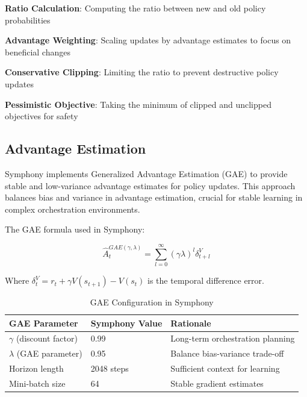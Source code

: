 \begin{expandedlist}
    \item \textbf{Ratio Calculation}: Computing the ratio between new and old policy probabilities
    \item \textbf{Advantage Weighting}: Scaling updates by advantage estimates to focus on beneficial changes
    \item \textbf{Conservative Clipping}: Limiting the ratio to prevent destructive policy updates
    \item \textbf{Pessimistic Objective}: Taking the minimum of clipped and unclipped objectives for safety
\end{expandedlist}

\subsection*{Advantage Estimation}

Symphony implements Generalized Advantage Estimation (GAE) to provide stable and low-variance advantage estimates for policy updates. This approach balances bias and variance in advantage estimation, crucial for stable learning in complex orchestration environments.

The GAE formula used in Symphony:

\begin{equation}
\hat{A}_t^{GAE(\gamma,\lambda)} = \sum_{l=0}^{\infty} (\gamma\lambda)^l \delta_{t+l}^V
\end{equation}

Where $\delta_t^V = r_t + \gamma V(s_{t+1}) - V(s_t)$ is the temporal difference error.

\begin{table}[ht]
\centering
\begin{tabular}{@{}lll@{}}
\toprule
\textbf{GAE Parameter} & \textbf{Symphony Value} & \textbf{Rationale} \\
\midrule
$\gamma$ (discount factor) & 0.99 & Long-term orchestration planning \\
$\lambda$ (GAE parameter) & 0.95 & Balance bias-variance trade-off \\
Horizon length & 2048 steps & Sufficient context for learning \\
Mini-batch size & 64 & Stable gradient estimates \\
\bottomrule
\end{tabular}
\caption{GAE Configuration in Symphony}
\end{table}

